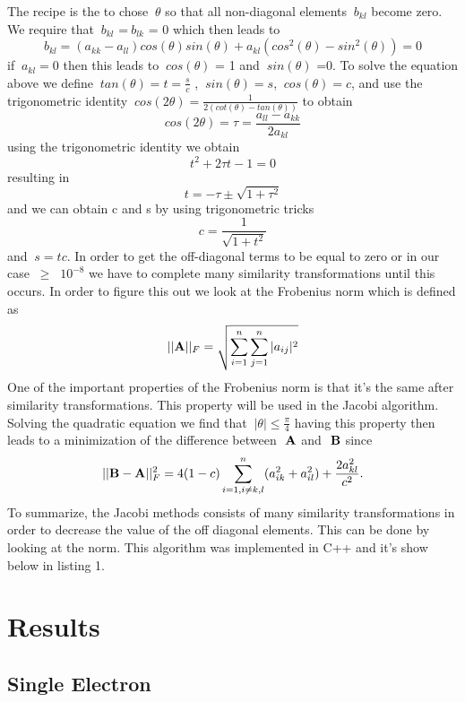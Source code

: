 \documentclass[11pt,a4wide]{article}
\begin{document}
The recipe is the to chose $\ \theta$ so that all non-diagonal elements $\ b_{kl}$ become zero. We require that $\ b_{kl}$ =$\ b_{lk}$ = 0 which then leads to 
\[
	b_{kl}=(a_{kk} - a_{ll})cos(\theta)sin(\theta) +a_{kl}(cos^2(\theta) -sin^2(\theta))=0	
\]
if $\ a_{kl}=0$ then this leads to $\ cos(\theta)$ = 1 and $\ sin(\theta)$ =0. To solve the equation above we define $\ tan(\theta)=t =\frac{s}{c}$ , $\ sin(\theta) =s$, $\ cos(\theta) = c$, and use the trigonometric identity $\ cos(2\theta)=\frac{1}{2(cot(\theta)-tan(\theta))}$ to obtain
\[
	cos(2\theta)=\tau= \frac{a_{ll} -a_{kk}}{2a_{kl}}
\]
using the trigonometric identity we obtain 
\[
	t^2 +2\tau t- 1=0
\]
resulting in 
\[
	t = -\tau \pm \sqrt{1+\tau^2}
\]
and we can obtain c and s by using trigonometric tricks 
\[
	c = \frac{1}{\sqrt{1+t^2}}
\]
and $\ s=tc $. In order to get the off-diagonal terms to be equal to zero or in our case  $\ \geq $ $\ 10^{-8}$ we have to complete many similarity transformations until this occurs. In order to figure this out we look at the Frobenius norm which is defined as 
\[
	||{\bf A}||_F = \sqrt{\sum_{i=1}^n \sum_{j=1}^n |a_{ij}|^2}
\]
One of the important properties of the Frobenius norm is that it's the same after similarity transformations. This property will be  used in the Jacobi algorithm. Solving the quadratic equation we find that $\ |\theta| \leq \frac{\pi}{4}$ having this property then leads to a minimization of the difference between $\ {\bf A}$ and $\ {\bf B}$ since 
\[
||{\bf B}-{\bf A}||_F^2=4(1-c)\sum_{i=1,i\ne k,l}^n(a_{ik}^2+a_{il}^2) +\frac{2a_{kl}^2}{c^2}.
\]
To summarize, the Jacobi methods consists of many similarity transformations in order to decrease the value of the off diagonal elements. This can be done by looking at the  norm. This algorithm was implemented in C++ and it's show below in listing 1. 





\section{Results}
\subsection{Single Electron} 
\end{document}
